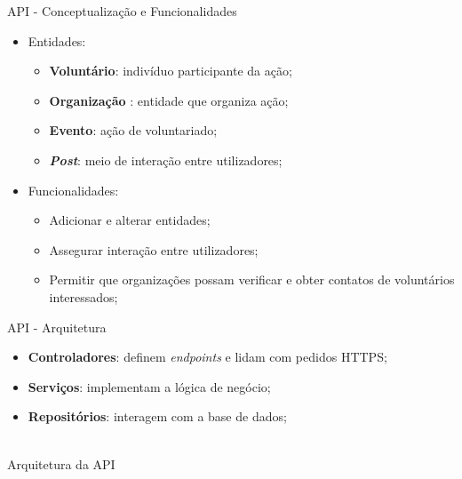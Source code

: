 \begin{frame}{API - Conceptualização e Funcionalidades}

\vspace*{-4em}

\begin{itemize}
	\item Entidades:
	\begin{itemize}
		\item \textbf{Voluntário}: indivíduo participante da ação;
		\item \textbf{Organização} : entidade que organiza ação;
		\item \textbf{Evento}: ação de voluntariado;
		\item \textbf{\textit{Post}}: meio de interação entre utilizadores;
	\end{itemize}

	\vspace*{1em}

	\item Funcionalidades:
	\begin{itemize}
		\item Adicionar e alterar entidades;
		\item Assegurar interação entre utilizadores;
		\item Permitir que organizações possam verificar e obter contatos de voluntários interessados;
	\end{itemize}
\end{itemize}

\end{frame}

\begin{frame}{API - Arquitetura}

\vspace*{-3em}

\begin{itemize}
	\item \textbf{Controladores}: definem \textit{endpoints} e lidam com pedidos HTTPS;
	\item \textbf{Serviços}: implementam a lógica de negócio;
	\item \textbf{Repositórios}: interagem com a base de dados;
\end{itemize}

\centering
{}\\
Arquitetura da API

\end{frame}